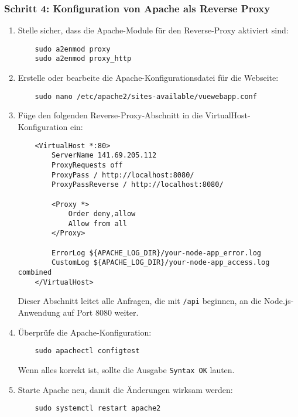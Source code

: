 \documentclass[a4paper,12pt]{article}
\begin{document}
\subsubsection{Schritt 4: Konfiguration von Apache als Reverse Proxy}
\begin{enumerate}
    \item Stelle sicher, dass die Apache-Module für den Reverse-Proxy aktiviert sind:

    \begin{lstlisting}
    sudo a2enmod proxy
    sudo a2enmod proxy_http
    \end{lstlisting}
    
    \item Erstelle oder bearbeite die Apache-Konfigurationsdatei für die Webseite:

    \begin{lstlisting}
    sudo nano /etc/apache2/sites-available/vuewebapp.conf
    \end{lstlisting}
    
    \item Füge den folgenden Reverse-Proxy-Abschnitt in die VirtualHost-Konfiguration ein:
    
    \begin{lstlisting}
    <VirtualHost *:80>
        ServerName 141.69.205.112
        ProxyRequests off
        ProxyPass / http://localhost:8080/
        ProxyPassReverse / http://localhost:8080/
    
        <Proxy *>
            Order deny,allow
            Allow from all
        </Proxy>
    
        ErrorLog ${APACHE_LOG_DIR}/your-node-app_error.log
        CustomLog ${APACHE_LOG_DIR}/your-node-app_access.log combined
    </VirtualHost>
    \end{lstlisting}
    
    Dieser Abschnitt leitet alle Anfragen, die mit \texttt{/api} beginnen, an die Node.js-Anwendung auf Port 8080 weiter.

    \item Überprüfe die Apache-Konfiguration:

    \begin{lstlisting}
    sudo apachectl configtest
    \end{lstlisting}
    
    Wenn alles korrekt ist, sollte die Ausgabe \texttt{Syntax OK} lauten.

    \item Starte Apache neu, damit die Änderungen wirksam werden:

    \begin{lstlisting}
    sudo systemctl restart apache2
    \end{lstlisting}
\end{enumerate}
\end{document}

